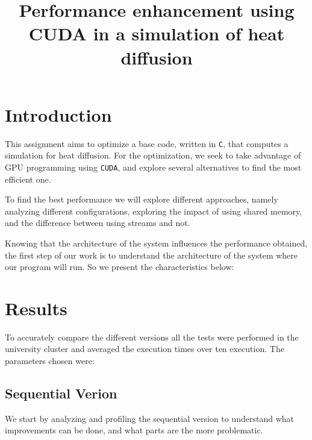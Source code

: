 \documentclass[conference]{IEEEtran}
\begin{document}
\title{Performance enhancement using CUDA in a simulation of heat diffusion}

\author{
  \and
}

\maketitle



\section{Introduction}
This assignment aims to optimize a base code, written in \texttt{C}, that computes a simulation for heat diffusion. For the optimization, we seek to take advantage of GPU programming using \texttt{CUDA}, and explore several alternatives to find the most efficient one.

To find the best performance we will explore different approaches, namely analyzing different configurations, exploring the impact of using shared memory, and the difference between using streams and not.

Knowing that the architecture of the system influences the performance obtained, the first step of our work is to understand the architecture of the system where our program will run. So we present the characteristics below:


\section{Results}
To accurately compare the different versions all the tests were performed in the university cluster and averaged the execution times over ten execution. The parameters chosen were:



\subsection{Sequential Verion}
We start by analyzing and profiling the sequential version to understand what improvements can be done, and what parts are the more problematic.
\end{document}
